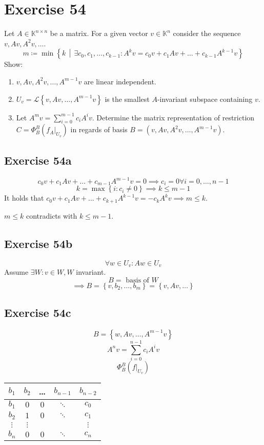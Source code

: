 \documentclass[a4paper]{article}
\theoremstyle{definition}
\newcommand\set[1]{\left\{#1\right\}}
\newcommand\setdef[2]{\left\{#1\,\middle|\,#2\right\}}
\begin{document}
\section*{Exercise 54}
\begin{ex}
  Let $A \in \mathbb K^{n \times n}$ be a matrix. For a given vector $v \in \mathbb K^n$ consider the sequence $v, Av, A^2 v, \dots$.
  \[ m \coloneqq \min\setdef{k}{\exists c_0, c_1, \dots, c_{k-1}: A^k v = c_0 v + c_1 Av + \dots + c_{k-1} A^{k-1} v} \]
  Show:
  \begin{enumerate}
    \item $v, Av, A^2 v, \dots, A^{m-1} v$ are linear independent.
    \item $U_v = \mathcal L\set{v, Av, \dots, A^{m-1} v}$ is the smallest $A$-invariant subspace containing $v$.
    \item Let $A^m v = \sum_{i=0}^{m-1} c_i A^i v$. Determine the matrix representation of restriction $C = \Phi_B^B(f_A|_{U_v})$ in regards of basis $B = (v, Av, A^2 v, \dots, A^{m-1} v)$.
  \end{enumerate}
\end{ex}

\subsection{Exercise 54a}
\[ c_0 v + c_1 Av + \dots + c_{m-1} A^{m-1} v = 0 \implies c_i = 0 \forall i = 0, \dots, n-1 \]
\[ k = \max\set{i: c_i \neq 0} \implies k \leq m - 1  \]
It holds that $c_0 v + c_1 Av + \dots + c_{k+1} A^{k-1} v = -c_k A^k v \implies m \leq k$.

$m \leq k$ contradicts with $k \leq m-1$.

\subsection{Exercise 54b}
\[ \forall w \in U_v: Aw \in U_v \]
Assume $\exists W: v \in W, W$ invariant.
\[ B = \text{ basis of } W \]
\[ \implies B = \set{v, b_2, \dots, b_m} = \set{v, Av, \dots} \]

\subsection{Exercise 54c}
\[ B = \set{w, Av, \dots, A^{m-1} v} \]
\[ A^n v = \sum_{i=0}^{n-1} c_i A^i v \]
\[ \Phi_B^B(f|_{U_v}) \]

\begin{table}
  \begin{center}
    \begin{tabular}{ccccc}
      $b_1$ & $b_2$ & \dots & $b_{n-1}$ & $b_{n-2}$ \\
    \hline
      $b_1$ & $0$ & $0$ & $\ddots$ & $c_0$ \\
      $b_2$ & $1$ & $0$ & $\ddots$ & $c_1$ \\
      $\vdots$ & $\vdots$ & & & $\vdots$ \\
      $b_n$ & $0$ & $0$ & $\ddots$ & $c_n$
    \end{tabular}
  \end{center}
\end{table}
\end{document}
